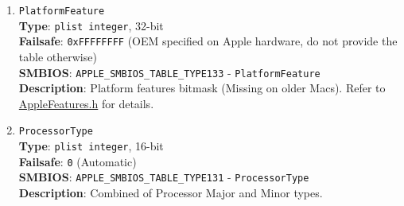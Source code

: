 \documentclass[]{article}
\begin{document}
\begin{enumerate}
  \texttt{FirmwareFeaturesMask} and
  \texttt{ExtendedFirmwareFeaturesMask}\\
  \textbf{Description}: Supported bits of extended firmware features
  bitmask. Refer to
  \href{https://github.com/acidanthera/MaxRegnerPkg/blob/master/Include/Apple/IndustryStandard/AppleFeatures.h}{AppleFeatures.h}
  for details. Lower 32 bits match \texttt{FirmwareFeaturesMask}.
  Upper 64 bits match \texttt{ExtendedFirmwareFeaturesMask}.
\item
  \texttt{PlatformFeature}\\
  \textbf{Type}: \texttt{plist\ integer}, 32-bit\\
  \textbf{Failsafe}: \texttt{0xFFFFFFFF} (OEM specified on Apple hardware, do not provide the table otherwise)\\
  \textbf{SMBIOS}: \texttt{APPLE\_SMBIOS\_TABLE\_TYPE133} -
  \texttt{PlatformFeature}\\
  \textbf{Description}: Platform features bitmask (Missing on older Macs). Refer to
  \href{https://github.com/acidanthera/MaxRegnerPkg/blob/master/Include/Apple/IndustryStandard/AppleFeatures.h}{AppleFeatures.h} for details.
\item
  \texttt{ProcessorType}\\
  \textbf{Type}: \texttt{plist\ integer}, 16-bit\\
  \textbf{Failsafe}: \texttt{0} (Automatic)\\
  \textbf{SMBIOS}: \texttt{APPLE\_SMBIOS\_TABLE\_TYPE131} -
  \texttt{ProcessorType}\\
  \textbf{Description}: Combined of Processor Major and Minor types.


\end{enumerate}
\end{document}
